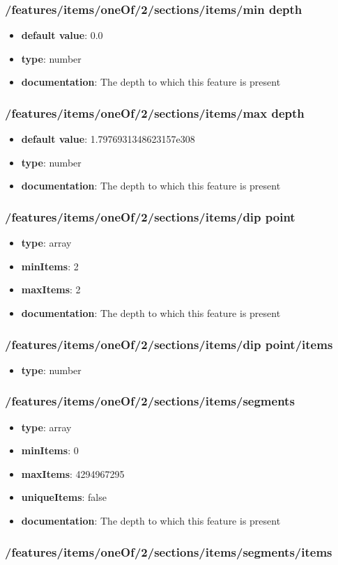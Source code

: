 \subsubsection{/features/items/oneOf/2/sections/items/min depth}
\begin{itemize}\item {\bf default value}: 0.0
\item {\bf type}: number
\item {\bf documentation}: The depth to which this feature is present
\end{itemize}\subsubsection{/features/items/oneOf/2/sections/items/max depth}
\begin{itemize}\item {\bf default value}: 1.7976931348623157e308
\item {\bf type}: number
\item {\bf documentation}: The depth to which this feature is present
\end{itemize}\subsubsection{/features/items/oneOf/2/sections/items/dip point}
\begin{itemize}\item {\bf type}: array
\item {\bf minItems}: 2
\item {\bf maxItems}: 2
\item {\bf documentation}: The depth to which this feature is present
\end{itemize}\subsubsection{/features/items/oneOf/2/sections/items/dip point/items}
\begin{itemize}\item {\bf type}: number
\end{itemize}\subsubsection{/features/items/oneOf/2/sections/items/segments}
\begin{itemize}\item {\bf type}: array
\item {\bf minItems}: 0
\item {\bf maxItems}: 4294967295
\item {\bf uniqueItems}: false
\item {\bf documentation}: The depth to which this feature is present
\end{itemize}\subsubsection{/features/items/oneOf/2/sections/items/segments/items}
